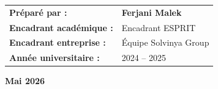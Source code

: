 \begin{titlepage}
\vspace{1.0cm}

\begin{center}
  \begin{tabular}{ll}
    \textbf{\color{espritBlue}Préparé par :}           & \textbf{Ferjani Malek} \\[6pt]
    \textbf{\color{espritBlue}Encadrant académique :}  & Encadrant ESPRIT \\[6pt]
    \textbf{\color{espritBlue}Encadrant entreprise :}  & Équipe Solvinya Group \\[6pt]
    \textbf{\color{espritBlue}Année universitaire :}   & 2024 -- 2025 \\
  \end{tabular}
\end{center}

\vspace{0.8cm}

\begin{center}
\end{center}

\vfill

\begin{center}
  {\color{white}\bfseries Mai 2026}
\end{center}

\end{titlepage}
